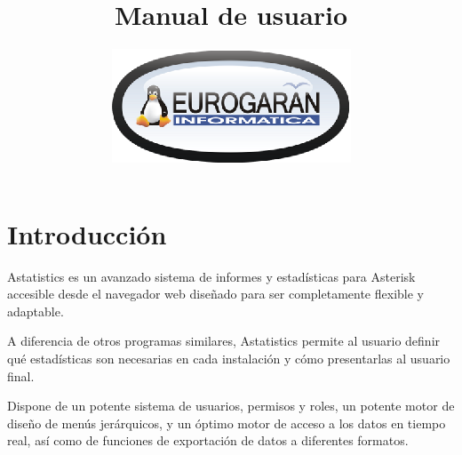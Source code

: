 \documentclass[spanish,12pt]{book}
\begin{document}
\title{
	\vspace{1cm}
	\linebreak Manual de usuario
}
\author{\includegraphics{artwork/logo-mini-oval-peq.ps}}
\maketitle
%
\cleardoublepage

 \tableofcontents \cleardoublepage \newpage {}

\chapter{Introducción}
Astatistics es un avanzado sistema de informes y estadísticas para Asterisk accesible desde el navegador web diseñado para ser completamente flexible y adaptable.

A diferencia de otros programas similares, Astatistics permite al usuario definir qué estadísticas son necesarias en cada instalación y cómo presentarlas al usuario final.

Dispone de un potente sistema de usuarios, permisos y roles, un potente motor de diseño de menús jerárquicos, y un óptimo motor de acceso a los datos en tiempo real, así como de funciones de exportación de datos a diferentes formatos.
\end{document}
